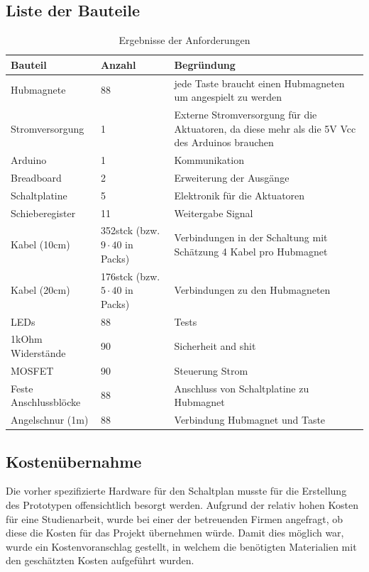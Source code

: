 \subsection{Liste der Bauteile}
\begin{table}[htbp]
    \centering
    \begin{tabular}{|m{3.8cm}|m{1.7cm}|m{8cm}|}
        \hline
        \textbf{Bauteil} &  \textbf{Anzahl} & \textbf{Begründung}  \\
        \hline
        Hubmagnete & 88 & jede Taste braucht einen Hubmagneten um angespielt zu werden \\ %
        \hline
        Stromversorgung & 1 & Externe Stromversorgung für die Aktuatoren, da diese mehr als die 5V Vcc des Arduinos brauchen \\
        \hline
        Arduino & 1 & Kommunikation \\
        \hline
        Breadboard & 2 & Erweiterung der Ausgänge \\
        \hline
        Schaltplatine & 5 & Elektronik für die Aktuatoren\\
        \hline
        Schieberegister & 11 & Weitergabe Signal\\
        \hline
        Kabel (10cm) & 352stck (bzw. $9\cdot40$ in Packs) & Verbindungen in der Schaltung mit Schätzung 4 Kabel pro Hubmagnet\\
        \hline
        Kabel (20cm) & 176stck (bzw.$5\cdot40$ in Packs) & Verbindungen zu den Hubmagneten \\
        \hline
        LEDs & 88 & Tests \\
        \hline
        1kOhm Widerstände & 90 & Sicherheit and shit \\
        \hline
        MOSFET & 90 & Steuerung Strom \\
        \hline
        Feste Anschlussblöcke & 88 & Anschluss von Schaltplatine zu Hubmagnet\\
        \hline
        Angelschnur (1m) & 88 & Verbindung Hubmagnet und Taste \\
        \hline
    \end{tabular}
    \caption{Ergebnisse der Anforderungen}
    \label{table:Bauteile}
\end{table}

\subsection{Kostenübernahme}
Die vorher spezifizierte Hardware für den Schaltplan musste für die Erstellung des Prototypen offensichtlich besorgt werden.
Aufgrund der relativ hohen Kosten für eine Studienarbeit, wurde bei einer der betreuenden Firmen angefragt, ob diese die Kosten für das Projekt übernehmen würde.
Damit dies möglich war, wurde ein Kostenvoranschlag gestellt, in welchem die benötigten Materialien mit den geschätzten Kosten aufgeführt wurden. %

